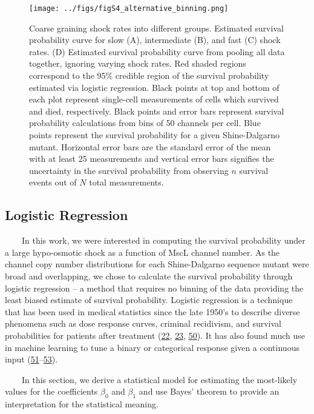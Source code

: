 \begin{figure}
\centering
\texttt{[image: ../figs/figS4\_alternative\_binning.png]}
\caption{Coarse
graining
shock
rates
into
different
groups.
Estimated
survival
probability
curve
for
slow
(A),
intermediate
(B),
and
fast
(C)
shock
rates.
(D)
Estimated
survival
probability
curve
from
pooling
all
data
together,
ignoring
varying
shock
rates.
Red
shaded
regions
correspond
to the
95\%
credible
region
of the
survival
probability
estimated
via
logistic
regression.
Black
points
at top
and
bottom
of
each
plot
represent
single-cell
measurements
of
cells
which
survived
and
died,
respectively.
Black
points
and
error
bars
represent
survival
probability
calculations
from
bins
of 50
channels
per
cell.
Blue
points
represent
the
survival
probability
for a
given
Shine-Dalgarno
mutant.
Horizontal
error
bars
are
the
standard
error
of the
mean
with
at
least
25
measurements
and
vertical
error
bars
signifies
the
uncertainty
in the
survival
probability
from
observing
\(n\)
survival
events
out of
\(N\)
total
measurements.}\label{fig:three_shock_group}
\end{figure}

\subsection{Logistic
Regression}\label{logistic-regression-1}

~~~~In
this
work,
we
were
interested
in
computing
the
survival
probability
under
a
large
hypo-osmotic
shock
as a
function
of
MscL
channel
number.
As the
channel
copy
number
distributions
for
each
Shine-Dalgarno
sequence
mutant
were
broad
and
overlapping,
we
chose
to
calculate
the
survival
probability
through
logistic
regression
-- a
method
that
requires
no
binning
of the
data
providing
the
least
biased
estimate
of
survival
probability.
Logistic
regression
is a
technique
that
has
been
used
in
medical
statistics
since
the
late
1950's
to
describe
diverse
phenomena
such
as
dose
response
curves,
criminal
recidivism,
and
survival
probabilities
for
patients
after
treatment
(\protect\hyperlink{ref-anderson2003}{22},
\protect\hyperlink{ref-mishra2016}{23},
\protect\hyperlink{ref-stahler2013}{50}).
It has
also
found
much
use in
machine
learning
to
tune a
binary
or
categorical
response
given
a
continuous
input
(\protect\hyperlink{ref-cheng2009}{51}--\protect\hyperlink{ref-ng}{53}).

~~~~In
this
section,
we
derive
a
statistical
model
for
estimating
the
most-likely
values
for
the
coefficients
\(\beta_0\)
and
\(\beta_1\)
and
use
Bayes'
theorem
to
provide
an
interpretation
for
the
statistical
meaning.

